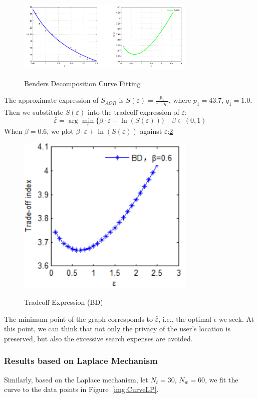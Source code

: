 \begin{figure}
\includegraphics[width=8.5cm]{CurveBD}
\label{img:CurveBD}
\caption{Benders Decomposition Curve Fitting}
\end{figure}

The approximate expression of $S_{AOR}$ is $S(\varepsilon)=\frac{p_1}{\varepsilon + q_1}$, where $p_1=43.7$, $q_1=1.0$. Then we substitute $S(\varepsilon)$ into the tradeoff expression of $\varepsilon$:
$$
	\hat{\varepsilon}=\arg \min_\varepsilon \{ \beta \cdot \varepsilon + \ln (S(\varepsilon)) \} \quad \beta \in (0,1)
$$
When $\beta=0.6$, we plot $\beta \cdot \varepsilon + \ln (S(\varepsilon))$ against $\varepsilon$:\ref{img:TradeoffBD}

\begin{figure}
\includegraphics[width=8.5cm]{TradeoffBD}
\label{img:TradeoffBD}
\caption{Tradeoff Expression (BD)}
\end{figure}

The minimum point of the graph corresponds to $\hat{\varepsilon}$, i.e., the optimal $\epsilon$ we seek. At this point, we can think that not only the privacy of the user's location is preserved, but also the excessive search expenses are avoided. 

\subsubsection{Results based on Laplace Mechanism}
Similarly, based on the Laplace mechanism, let $N_t=30$, $N_w=60$, we fit the curve to the data points in Figure~\ref{img:CurveLP}.

